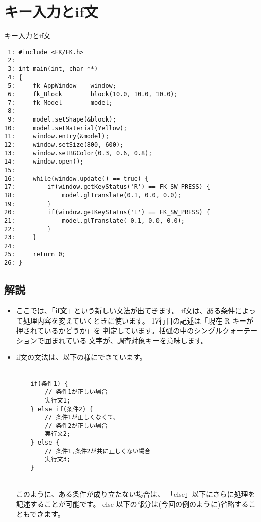 \section{キー入力とif文} \label{sec:03-key}
\begin{itembox}[l]{キー入力とif文}
\begin{verbatim}
 1: #include <FK/FK.h>
 2: 
 3: int main(int, char **)
 4: {
 5:     fk_AppWindow    window;
 6:     fk_Block        block(10.0, 10.0, 10.0);
 7:     fk_Model        model;
 8: 
 9:     model.setShape(&block);
10:     model.setMaterial(Yellow);
11:     window.entry(&model);
12:     window.setSize(800, 600);
13:     window.setBGColor(0.3, 0.6, 0.8);
14:     window.open();
15: 
16:     while(window.update() == true) {
17:         if(window.getKeyStatus('R') == FK_SW_PRESS) {
18:             model.glTranslate(0.1, 0.0, 0.0);
19:         }
20:         if(window.getKeyStatus('L') == FK_SW_PRESS) {
21:             model.glTranslate(-0.1, 0.0, 0.0);
22:         } 
23:     }
24: 
25:     return 0;
26: }
\end{verbatim}
\end{itembox}

\subsection*{解説}
\begin{itemize}
 \item ここでは、「\textbf{if文}」という新しい文法が出てきます。
	if文は、ある条件によって処理内容を変えていくときに使います。
	17行目の記述は「現在 R キーが押されているかどうか」を
	判定しています。括弧の中のシングルクォーテーションで囲まれている
	文字が、調査対象キーを意味します。

 \item if文の文法は、以下の様にできています。\\ ~ \\
	\begin{shadebox}
	\begin{verbatim}
	if(条件1) {
	    // 条件1が正しい場合
	    実行文1;
	} else if(条件2) {
	    // 条件1が正しくなくて、
	    // 条件2が正しい場合
	    実行文2;
	} else {
	    // 条件1,条件2が共に正しくない場合
	    実行文3;
	}
	\end{verbatim}
	\end{shadebox} ~ \\
	このように、ある条件が成り立たない場合は、
	「else」以下にさらに処理を記述することが可能です。
	else 以下の部分は(今回の例のように)省略することもできます。
\end{itemize}


